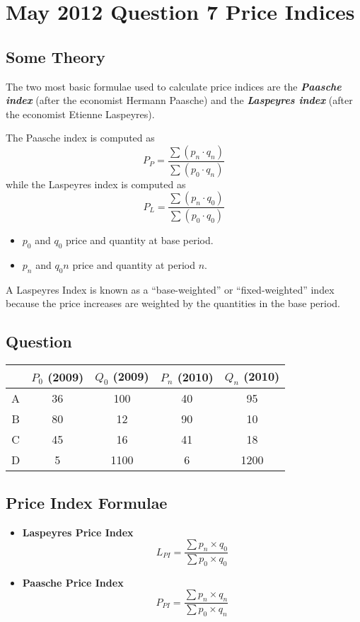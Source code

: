\documentclass[12pts]{article}
\begin{document}
\section*{May 2012 Question 7 Price Indices}

\subsection*{Some Theory}
The two most basic formulae used to calculate price indices are the \textbf{\textit{Paasche index}} (after the economist Hermann Paasche) 
and the \textbf{\textit{Laspeyres index}} (after the economist Etienne Laspeyres).

The Paasche index is computed as
\[  P_P=\frac{\sum (p_{n}\cdot q_{n})}{\sum (p_{0}\cdot q_{n})}  \]
while the Laspeyres index is computed as
\[  P_L=\frac{\sum (p_{n}\cdot q_{0})}{\sum (p_{0}\cdot q_{0})}  \]


\begin{itemize}
\item $p_0$ and $q_0$ price and quantity at base period.
\item $p_n$ and $q_0n$ price and quantity at period $n$.
\end{itemize}

A Laspeyres Index is known as a “base-weighted” or “ﬁxed-weighted” index because the price increases are
weighted by the quantities in the base period.

\subsection*{Question}
\begin{center}
\begin{tabular}{|c|c|c|c|c|}
\hline \rule[-2ex]{0pt}{5.5ex}  & $P_0$ (2009) & $Q_0$ (2009) & $P_n$ (2010) & $Q_n$ (2010) \\ 
\hline \rule[-2ex]{0pt}{5.5ex} A & 36 & 100 & 40 & 95 \\ 
\hline \rule[-2ex]{0pt}{5.5ex} B & 80 & 12 & 90 & 10 \\ 
\hline \rule[-2ex]{0pt}{5.5ex} C & 45 & 16 & 41 & 18 \\ 
\hline \rule[-2ex]{0pt}{5.5ex} D & 5 & 1100 & 6 & 1200 \\ \hline 
\end{tabular} 
\end{center}

\subsection*{Price Index Formulae}
\begin{itemize}
\item \textbf{Laspeyres Price Index} 
\[L_{PI} =  \frac{\sum  p_n \times q_0}{\sum  p_0 \times q_0}\]
\item \textbf{Paasche Price Index}
\[P_{PI} =  \frac{\sum  p_n \times q_n}{\sum  p_0 \times q_n}\]
\end{itemize}
\end{document}
